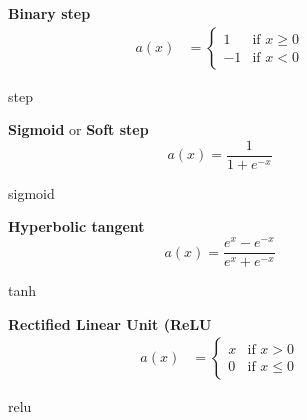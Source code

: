 \begin{figure}[!h]
\begin{minipage}{0.45\textwidth}

    \centering
{}
\caption{step}
    \label{fig:act_step}
\end{minipage}
\hfill
\begin{minipage}{0.5\textwidth}
    \textbf{Binary step}
      \begin{align}
        a(x) &=
        \begin{cases}
        1   & \text{if } x \geq 0 \\
        -1  & \text{if } x < 0 
  \end{cases}
\end{align}
\end{minipage}
    \end{figure}
    
\begin{figure}[!h]
\begin{minipage}{0.45\textwidth}

    \centering
{}
\caption{sigmoid}
    \label{fig:act_sig}
\end{minipage}
\hfill
\begin{minipage}{0.5\textwidth}
    \textbf{Sigmoid} or \textbf{Soft step}
   \begin{equation}
       a(x) =\frac{1}{1+e^{-x}}
   \end{equation}
\end{minipage}
    \end{figure}


\begin{figure}[!h]
\begin{minipage}{0.45\textwidth}
    \centering
{}
\caption{tanh}
    \label{fig:act_tanh}
\end{minipage}
\hfill
\begin{minipage}{0.5\textwidth}
    \textbf{Hyperbolic tangent}
   \begin{equation}
       a(x) =\frac{e^x-e^{-x}}{e^x+e^{-x}}
   \end{equation}
\end{minipage}
\end{figure}

\begin{figure}[!h]
\begin{minipage}{0.45\textwidth}
    \centering
{}
\caption{relu}
    \label{fig:act_relu}
\end{minipage}
\hfill
\begin{minipage}{0.5\textwidth}
    \textbf{Rectified Linear Unit (ReLU}
   \begin{align}
        a(x) &=
        \begin{cases}
        x   & \text{if } x > 0 \\
        0  & \text{if } x \leq 0 
  \end{cases}
\end{align}
\end{minipage}
\end{figure}

